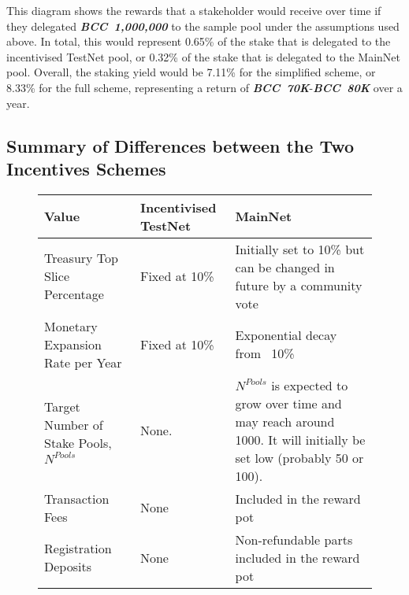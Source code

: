 \documentclass[11pt,a4paper,dvipsnames,twosided,final]{article}
\newcommand{\bcc}{BCC{}}
\newcommand{\BCC}[1]{\textbf{\emph{\bcc~{#1}}}}
\newcommand{\bcc}[1]{Bcc}
\begin{document}
\noindent
This diagram shows the rewards that a stakeholder would receive over time if they delegated \BCC{1,000,000} to
the sample pool under the assumptions used above.  In total, this would represent 0.65\% of the stake
that is delegated to the incentivised TestNet pool, or 0.32\% of the stake that is delegated to the MainNet pool.
Overall, the staking yield would be 7.11\% for the simplified scheme, or 8.33\% for the full scheme, representing
a return of \BCC{70K}-\BCC{80K} over a year.

\clearpage
\subsection{Summary of Differences between the Two Incentives Schemes}
\label{sec:summary}

\begin{figure}[h!]
\begin{center}
\begin{tabular}{||l|p{4cm}|p{4cm}||}
  \hline\hline
  \textbf{Value} & \textbf{Incentivised TestNet} & \textbf{MainNet}
                                              \\\hline
Treasury Top Slice Percentage
& Fixed at 10\%
& Initially set to 10\% but can be changed in future by a community vote
                                              \\\hline
Monetary Expansion Rate per Year
& Fixed at 10\%
& Exponential decay from ~10\%
                                              \\\hline
 Target Number of Stake Pools, $N^{\textit{Pools}}$
                 &
                   None.
                   &
$N^{\textit{Pools}}$ is expected to grow over time and may reach around 1000.
                     It will initially be set low (probably 50 or 100). %
  \\\hline
Transaction Fees
& None
& Included in the reward pot
                                              \\\hline
Registration Deposits
& None
& Non-refundable parts included in the reward pot
                                              \\\hline

\end{tabular}
\end{center}
\end{figure}
\end{document}
